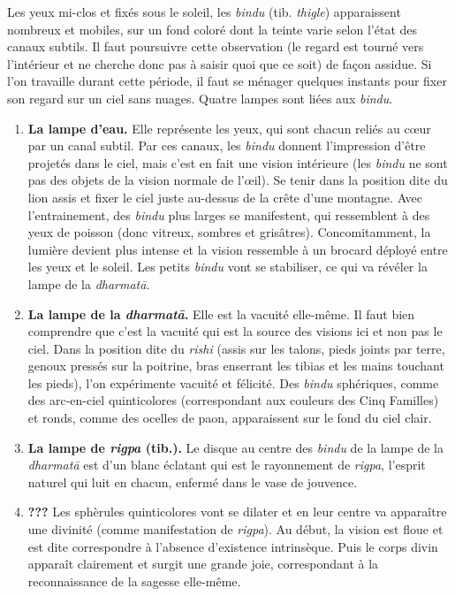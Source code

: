 \documentclass[11pt,a4paper]{article}
\begin{document}
Les yeux mi\hyp{}clos et fixés sous le soleil, les \emph{bindu}
(tib. \emph{thigle}) apparaissent nombreux et mobiles, sur un fond
coloré dont la teinte varie selon l'état des canaux subtils. Il faut
poursuivre cette observation (le regard est tourné vers l'intérieur et
ne cherche donc pas à saisir quoi que ce soit) de façon assidue. Si
l'on travaille durant cette période, il faut se ménager quelques
instants pour fixer son regard sur un ciel sans nuages. Quatre lampes
sont liées aux \emph{bindu}.
  \begin{enumerate}

    \item \textbf{La lampe d'eau.} Elle représente les yeux, qui sont
      chacun reliés au c{\oe}ur par un canal subtil. Par ces canaux,
      les \emph{bindu} donnent l'impression d'être projetés dans le
      ciel, mais c'est en fait une vision intérieure (les \emph{bindu}
      ne sont pas des objets de la vision normale de l'{\oe}il). Se
      tenir dans la position dite du lion assis et fixer le ciel juste
      au\hyp{}dessus de la crête d'une montagne. Avec l'entrainement,
      des \emph{bindu} plus larges se manifestent, qui ressemblent à
      des yeux de poisson (donc vitreux, sombres et
      grisâtres). Concomitamment, la lumière devient plus intense et
      la vision ressemble à un brocard déployé entre les yeux et le
      soleil. Les petits \emph{bindu} vont se stabiliser, ce qui va
      révéler la lampe de la \emph{dharmat\=a}.

    \item \textbf{La lampe de la \emph{dharmat\=a}.} Elle est la
      vacuité elle\hyp{}même. Il faut bien comprendre que c'est la
      vacuité qui est la source des visions ici et non pas le
      ciel. Dans la position dite du \emph{rishi} (assis sur les
      talons, pieds joints par terre, genoux pressés sur la poitrine,
      bras enserrant les tibias et les mains touchant les pieds), l'on
      expérimente vacuité et félicité. Des \emph{bindu} sphériques,
      comme des arc\hyp{}en\hyp{}ciel quinticolores (correspondant aux
      couleurs des Cinq Familles) et ronds, comme des ocelles de paon,
      apparaissent sur le fond du ciel clair.

    \item \textbf{La lampe de \emph{rigpa} (tib.).} Le disque au
      centre des \emph{bindu} de la lampe de la \emph{dharmat\=a} est
      d'un blanc éclatant qui est le rayonnement de \emph{rigpa},
      l'esprit naturel qui luit en chacun, enfermé dans le vase de
      jouvence.

    \item \textbf{???} Les sphèrules quinticolores vont se dilater et
      en leur centre va apparaître une divinité (comme manifestation
      de \emph{rigpa}). Au début, la vision est floue et est dite
      correspondre à l'absence d'existence intrinsèque. Puis le corps
      divin apparaît clairement et surgit une grande joie,
      correspondant à la reconnaissance de la sagesse elle\hyp{}même.

  \end{enumerate}
\end{document}
